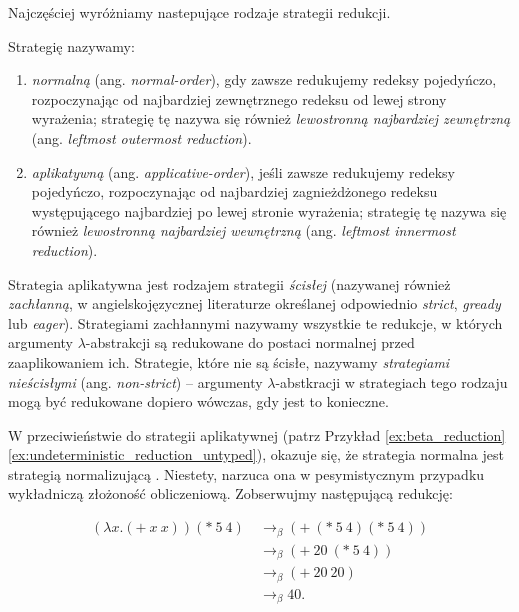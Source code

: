 Najczęściej wyróżniamy nastepujące rodzaje strategii redukcji.

\begin{definicja}
Strategię nazywamy:
\begin{enumerate}
  \item \emph{normalną} (ang. \emph{normal-order}), gdy zawsze redukujemy redeksy pojedyńczo, rozpoczynając od najbardziej zewnętrznego redeksu od lewej strony wyrażenia; strategię tę nazywa się również \emph{lewostronną najbardziej zewnętrzną} (ang. \emph{leftmost outermost reduction}).
\item \emph{aplikatywną} (ang. \emph{applicative-order}), jeśli zawsze redukujemy redeksy pojedyńczo, rozpoczynając od najbardziej zagnieżdżonego redeksu występującego najbardziej po lewej stronie wyrażenia; strategię tę nazywa się również \emph{lewostronną najbardziej wewnętrzną} (ang. \emph{leftmost innermost reduction}).

\end{enumerate}
\end{definicja}

Strategia aplikatywna jest rodzajem strategii \emph{ścisłej} (nazywanej również \emph{zachłanną}, w angielskojęzycznej literaturze określanej odpowiednio \emph{strict}, \emph{gready} lub \emph{eager}). Strategiami zachłannymi nazywamy wszystkie te redukcje, w których argumenty \(\lambda\)-abstrakcji są redukowane do postaci normalnej przed zaaplikowaniem ich. Strategie, które nie są ścisłe, nazywamy \emph{strategiami nieścisłymi} (ang. \emph{non-strict}) -- argumenty \(\lambda\)-abstkracji w strategiach tego rodzaju mogą być redukowane dopiero wówczas, gdy jest to konieczne.

W przeciwieństwie do strategii aplikatywnej (patrz Przykład \ref{ex:beta_reduction}\ref{ex:undeterministic_reduction_untyped}), okazuje się, że strategia normalna jest strategią normalizującą \cite[Rozdział 1.5]{Urzyczyn2006}. Niestety, narzuca ona w pesymistycznym przypadku wykładniczą złożoność obliczeniową. Zobserwujmy następującą redukcję:

\begin{align*}
  \left(\lambda x.(+\ x\ x)\right)(*\ 5\ 4)\ &\to_\beta (+\ (*\ 5\ 4)(*\ 5\ 4))\tag{\(\blacktriangledown\)}\label{ex:normal_reduction}\\
  &\to_\beta (+\ 20\ (*\ 5\ 4))\\
  &\to_\beta (+\ 20\ 20)\\
  &\to_\beta 40.
\end{align*}

